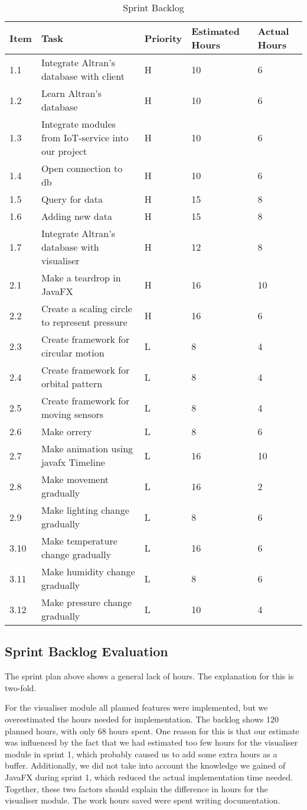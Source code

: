 \documentclass[../document]{subfiles}
\begin{document}
\begin{table}[H]
\caption{Sprint Backlog}
\centering
\begin{tabularx}{\textwidth}{|l|X|l|l|l|}
\hline
Item
&Task
&Priority
&Estimated Hours
&Actual Hours
\\ \hline 1.1
&Integrate Altran's database with client
&H
&10
&6
\\ \hline 1.2
&Learn Altran's database
&H
&10
&6
\\ \hline 1.3
&Integrate modules from IoT-service into our project
&H
&10
&6
\\ \hline 1.4
&Open connection to db
&H
&10
&6
\\ \hline 1.5
&Query for data
&H
&15
&8
\\ \hline 1.6
&Adding new data
&H
&15
&8
\\ \hline 1.7
&Integrate Altran's database with visualiser
&H
&12
&8
\\ \hline 2.1
&Make a teardrop in JavaFX
&H
&16
&10
\\ \hline 2.2
&Create a scaling circle to represent pressure
&H
&16
&6
\\ \hline 2.3
&Create framework for circular motion
&L
&8
&4
\\ \hline 2.4
&Create framework for orbital pattern
&L
&8
&4
\\ \hline 2.5
&Create framework for moving sensors
&L
&8
&4
\\ \hline 2.6
&Make orrery
&L
&8
&6
\\ \hline 2.7
&Make animation using javafx Timeline
&L
&16
&10
\\ \hline 2.8
&Make movement gradually
&L
&16
&2
\\ \hline 2.9
&Make lighting change gradually
&L
&8
&6
\\ \hline 3.10
&Make temperature change gradually
&L
&16
&6
\\ \hline 3.11
&Make humidity change gradually
&L
&8
&6
\\ \hline 3.12
&Make pressure change gradually
&L
&10
&4
\\ \hline 
\end{tabularx}
\end{table}

\subsection{Sprint Backlog Evaluation}
The sprint plan above shows a general lack of hours. The explanation for this is two-fold.

For the visualiser module all planned features were implemented, but we overestimated the hours needed for implementation. The backlog shows 120 planned hours, with only 68 hours spent. One reason for this is that our estimate was influenced by the fact that we had estimated too few hours for the visualiser module in sprint 1, which probably caused us to add some extra hours as a buffer. Additionally, we did not take into account the knowledge we gained of JavaFX during sprint 1, which reduced the actual implementation time needed. Together, these two factors should explain the difference in hours for the visualiser module. The work hours saved were spent writing documentation.
\end{document}
